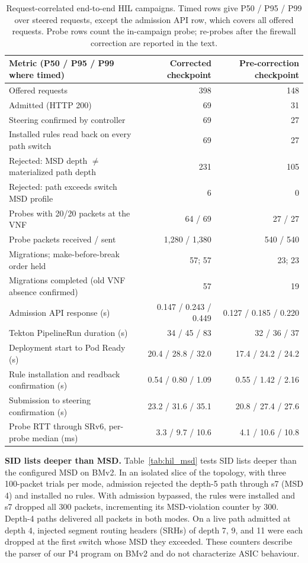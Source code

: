 \documentclass[final,5p]{elsarticle}
\newcommand{\rev}[1]{\textcolor{revisiongreen}{#1}}
\let\newrev\rev
\begin{document}
\begin{table}[t]
\centering
\caption{\newrev{Request-correlated end-to-end HIL campaigns. Timed rows give P50 / P95 / P99 over steered requests, except the admission API row, which covers all offered requests. Probe rows count the in-campaign probe; re-probes after the firewall correction are reported in the text.}}
\label{tab:hil_e2e}
{\color{revisiongreen}
\small
\begin{tabular}{@{}lrr@{}}
\toprule
Metric (P50 / P95 / P99 where timed) & Corrected checkpoint & Pre-correction checkpoint \\
\midrule
Offered requests & 398 & 148 \\
Admitted (HTTP 200) & 69 & 31 \\
Steering confirmed by controller & 69 & 27 \\
Installed rules read back on every path switch & 69 & 27 \\
Rejected: MSD depth $\neq$ materialized path depth & 231 & 105 \\
Rejected: path exceeds switch MSD profile & 6 & 0 \\
Probes with 20/20 packets at the VNF & 64 / 69 & 27 / 27 \\
Probe packets received / sent & 1,280 / 1,380 & 540 / 540 \\
Migrations; make-before-break order held & 57; 57 & 23; 23 \\
Migrations completed (old VNF absence confirmed) & 57 & 19 \\
Admission API response (s) & 0.147 / 0.243 / 0.449 & 0.127 / 0.185 / 0.220 \\
Tekton PipelineRun duration (s) & 34 / 45 / 83 & 32 / 36 / 37 \\
Deployment start to Pod Ready (s) & 20.4 / 28.8 / 32.0 & 17.4 / 24.2 / 24.2 \\
Rule installation and readback confirmation (s) & 0.54 / 0.80 / 1.09 & 0.55 / 1.42 / 2.16 \\
Submission to steering confirmation (s) & 23.2 / 31.6 / 35.1 & 20.8 / 27.4 / 27.6 \\
Probe RTT through SRv6, per-probe median (ms) & 3.3 / 9.7 / 10.6 & 4.1 / 10.6 / 10.8 \\
\bottomrule
\end{tabular}
}
\end{table}

\newrev{\textbf{SID lists deeper than MSD.} Table~\ref{tab:hil_msd} tests SID lists deeper than the configured MSD on BMv2. In an isolated slice of the topology, with three 100-packet trials per mode, admission rejected the depth-5 path through s7 (MSD 4) and installed no rules. With admission bypassed, the rules were installed and s7 dropped all 300 packets, incrementing its MSD-violation counter by 300. Depth-4 paths delivered all packets in both modes. On a live path admitted at depth 4, injected segment routing headers (SRHs) of depth 7, 9, and 11 were each dropped at the first switch whose MSD they exceeded. These counters describe the parser of our P4 program on BMv2 and do not characterize ASIC behaviour.}
\end{document}
